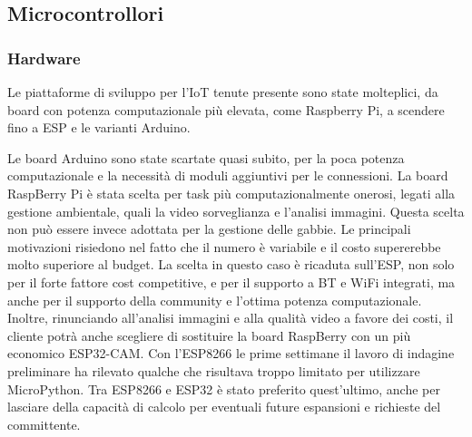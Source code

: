         \subsection{Microcontrollori}
        \subsubsection{Hardware}
        Le piattaforme di sviluppo per l'IoT tenute presente sono state molteplici, da board con potenza computazionale più elevata, come Raspberry Pi, a scendere fino a ESP e le varianti Arduino. 
        
        Le board Arduino sono state scartate quasi subito, per la poca potenza computazionale e la necessità di moduli aggiuntivi per le connessioni. 
        La board RaspBerry Pi è stata scelta per task più computazionalmente onerosi, legati alla gestione ambientale, quali la video sorveglianza e l'analisi immagini. 
        Questa scelta non può essere invece adottata per la gestione delle gabbie. Le principali motivazioni risiedono nel fatto che il numero è variabile e il costo supererebbe molto superiore al budget. 
        La scelta in questo caso è ricaduta sull'ESP, non solo per il forte fattore cost competitive, e per il supporto a BT e WiFi integrati, ma anche per il supporto della community e l'ottima potenza computazionale. Inoltre, rinunciando all'analisi immagini e alla qualità video a favore dei costi, il cliente potrà anche scegliere di sostituire la board RaspBerry con un più economico ESP32-CAM.
        Con l'ESP8266 le prime settimane il lavoro di indagine preliminare ha rilevato qualche che risultava troppo limitato per utilizzare MicroPython.
        Tra ESP8266 e ESP32 è stato preferito quest'ultimo, anche per lasciare della capacità di calcolo per eventuali future espansioni e richieste del committente. 
